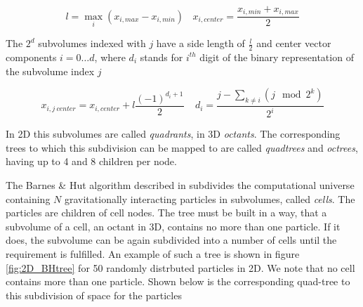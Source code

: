 \begin{equation}
\label{ch02_grav02_eq012}
l = \max_{i} ( x_{i,max} - x_{i,min})  ~~~~ x_{i,center}= \frac{ x_{i,min} + x_{i,max} }{2}
\end{equation}

The $2^{d}$ subvolumes indexed with $j$ have a side length of $\frac{l}{2}$ and center vector components $i = 0 \dots d$, where $d_{i}$ stands for $i^{th}$ digit of the binary representation of the subvolume index $j$

\begin{equation}
\label{ch02_grav02_eq013}
x_{i, j~center} = x_{i,center} + l \frac{(-1)^{d_{i} + 1}}{2} ~~~~~ d_{i} = \frac{j  - \sum_{k \ne i} ( j \mod 2^{k} )}{2^{i}}
\end{equation}

In 2D this subvolumes are called \emph{quadrants}, in 3D \emph{octants}. The corresponding trees to which this subdivision can be mapped to are called \emph{quadtrees} and \emph{octrees}, having up to 4 and 8 children per node.

The Barnes \& Hut algorithm described in \cite{1986Natur.324..446B} subdivides the computational universe containing $N$ gravitationally interacting particles in subvolumes, called \emph{cells}. The particles are children of cell nodes. The tree must be built in a way, that a subvolume of a cell, an octant in 3D, contains no more than one particle. If it does, the subvolume can be again subdivided into a number of cells until the requirement is fulfilled. An example of such a tree is shown in figure \ref{fig:2D_BHtree} for 50 randomly distrbuted particles in 2D. We note that no cell contains more than one particle. Shown below is the corresponding quad-tree to this subdivision of space for the particles

